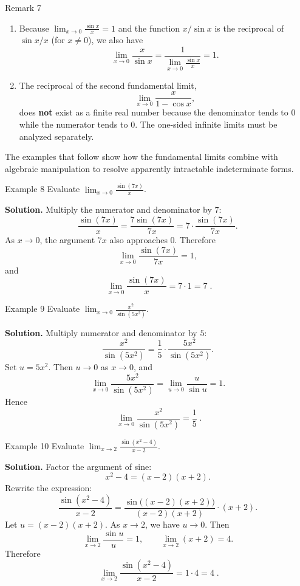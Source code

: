 \begin{remarkbox}{Remark 7}
\begin{enumerate}
    \item Because \(\displaystyle \lim_{x \to 0} \frac{\sin x}{x} = 1\) and the function \(x/\sin x\) is the reciprocal of \(\sin x / x\) (for \(x \neq 0\)), we also have
    \[
    \lim_{x \to 0} \frac{x}{\sin x} = \frac{1}{\lim_{x \to 0} \frac{\sin x}{x}} = 1.
    \]
    \item The reciprocal of the second fundamental limit,
    \[
    \lim_{x \to 0} \frac{x}{1 - \cos x},
    \]
    does \textbf{not} exist as a finite real number because the denominator tends to \(0\) while the numerator tends to \(0\). The one-sided infinite limits must be analyzed separately.
\end{enumerate}
\end{remarkbox}

\medskip
The examples that follow show how the fundamental limits combine with algebraic manipulation to resolve apparently intractable indeterminate forms.

\begin{examplebox}{Example 8}
Evaluate \(\displaystyle \lim_{x \to 0} \frac{\sin(7x)}{x}\).

\medskip
\textbf{Solution.}
Multiply the numerator and denominator by \(7\):
\[
\frac{\sin(7x)}{x}
= \frac{7 \sin(7x)}{7x}
= 7 \cdot \frac{\sin(7x)}{7x}.
\]
As \(x \to 0\), the argument \(7x\) also approaches \(0\). Therefore
\[
\lim_{x \to 0} \frac{\sin(7x)}{7x} = 1,
\]
and
\[
\boxed{\;\lim_{x \to 0} \frac{\sin(7x)}{x} = 7 \cdot 1 = 7\;}.
\]
\end{examplebox}

\begin{examplebox}{Example 9}
Evaluate \(\displaystyle \lim_{x \to 0} \frac{x^{2}}{\sin(5x^{2})}\).

\medskip
\textbf{Solution.}
Multiply numerator and denominator by \(5\):
\[
\frac{x^{2}}{\sin(5x^{2})}
= \frac{1}{5} \cdot \frac{5x^{2}}{\sin(5x^{2})}.
\]
Set \(u = 5x^{2}\). Then \(u \to 0\) as \(x \to 0\), and
\[
\lim_{x \to 0} \frac{5x^{2}}{\sin(5x^{2})}
= \lim_{u \to 0} \frac{u}{\sin u}
= 1.
\]
Hence
\[
\boxed{\;\lim_{x \to 0} \frac{x^{2}}{\sin(5x^{2})} = \frac{1}{5}\;}.
\]
\end{examplebox}

\begin{examplebox}{Example 10}
Evaluate \(\displaystyle \lim_{x \to 2} \frac{\sin(x^{2} - 4)}{x - 2}\).

\medskip
\textbf{Solution.}
Factor the argument of sine:
\[
x^{2} - 4 = (x - 2)(x + 2).
\]
Rewrite the expression:
\[
\frac{\sin(x^{2} - 4)}{x - 2}
= \frac{\sin\bigl((x - 2)(x + 2)\bigr)}{(x - 2)(x + 2)} \cdot (x + 2).
\]
Let \(u = (x - 2)(x + 2)\). As \(x \to 2\), we have \(u \to 0\). Then
\[
\lim_{x \to 2} \frac{\sin u}{u} = 1,
\qquad
\lim_{x \to 2} (x + 2) = 4.
\]
Therefore
\[
\boxed{\;\lim_{x \to 2} \frac{\sin(x^{2} - 4)}{x - 2} = 1 \cdot 4 = 4\;}.
\]
\end{examplebox}

